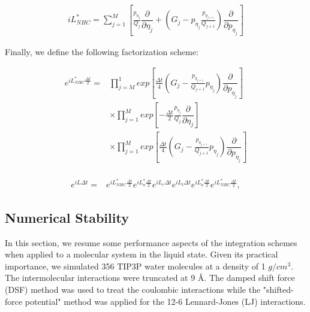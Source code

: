\documentclass[aip,jcp,reprint,amsmath,amssymb]{revtex4-1}
\newcommand{\diff}[2]{\dfrac{\partial #1}{\partial #2}} %
\begin{document}
\begin{equation}
\begin{split}
i L^\ast_{NHC} = \sum_{j=1}^{M}\left[\frac{p_{\eta_j}}{Q_j}\diff{}{\eta_j} + \left(G_j - p_{\eta_j} \frac{p_{\eta_{j+1}}}{Q_{j+1}}\right) \diff{}{p_{\eta_j}}\right] 
\end{split}
\end{equation}

Finally, we define the following factorization scheme:
\begin{widetext}
\begin{equation}
\begin{split}
e^{iL^\ast_{NHC} \frac{\Delta t}{2}} =  &\prod_{j=M}^{1} exp\left[\frac{\Delta t}{4} \left( G_j - \frac{p_{\eta_{j+1}}}{Q_{j+1}} p_{\eta_j} \right) \diff{}{p_{\eta_j}}\right] \\
& \times\prod_{j=1}^{M} exp\left[-\frac{\Delta t}{2}  \frac{p_{\eta_j}}{Q_j}\diff{}{\eta_j}\right]   \\
& \times \prod_{j=1}^{M} exp\left[\frac{\Delta t}{4} \left( G_j - \frac{p_{\eta_{j+1}}}{Q_{j+1}} p_{\eta_j} \right) \diff{}{p_{\eta_j}}\right]  \\
\end{split}
\end{equation}
\end{widetext}

\begin{equation}
\label{eq:trotter_splitting_*}
\begin{split}
e^{i L \Delta t} = &e^{i L^\ast_{NHC} \frac{\Delta t}{2}} e^{i L^\ast_a \frac{\Delta t}{2}} e^{i L_r \Delta t} e^{i L_t \Delta t} e^{i L^\ast_a \frac{\Delta t}{2}} e^{i L^\ast_{NHC} \frac{\Delta t}{2}},
\end{split}
\end{equation}

\subsection{Numerical Stability}
\label{sec:performance}
In this section, we resume some performance aspects of the integration schemes when applied to a molecular system in the liquid state. Given its practical importance, we simulated 356 TIP3P\cite{Price2004} water molecules at a density of 1 $g/cm^3$. The intermolecular interactions were truncated at 9 {\AA}. The damped shift force (DSF) method\cite{Fennell2006} was used to treat the coulombic interactions while  the "shifted-force potential"\citep{Allen1989} method was applied for the 12-6 Lennard-Jones (LJ) interactions.
\end{document}
